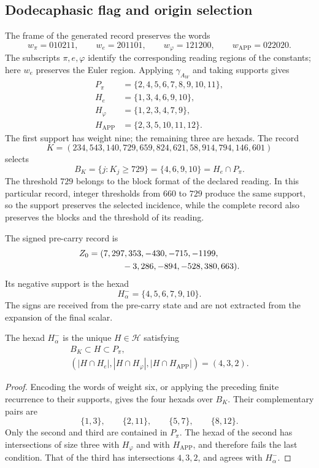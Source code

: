 \subsection{Dodecaphasic flag and origin selection}
\label{subsec:lf-flag}

The frame of the generated record preserves the words
\[
 w_\pi=010211,\qquad
 w_e=201101,\qquad
 w_\varphi=121200,\qquad
 w_{\mathrm{APP}}=022020.
\]
The subscripts \(\pi,e,\varphi\) identify the corresponding
reading regions of the constants; here \(w_e\) preserves
the Euler region. Applying \(\gamma_{A_W}\) and taking supports gives
\[
\begin{aligned}
 P_\pi&=\{2,4,5,6,7,8,9,10,11\},\\
 H_e&=\{1,3,4,6,9,10\},\\
 H_\varphi&=\{1,2,3,4,7,9\},\\
 H_{\mathrm{APP}}&=\{2,3,5,10,11,12\}.
\end{aligned}
\]
The first support has weight nine; the remaining three are
hexads. The record
\[
 K=(234,543,140,729,659,824,621,58,914,794,146,601)
\]
selects
\[
 B_K=\{j:K_j\geq729\}=\{4,6,9,10\}=H_e\cap P_\pi.
\]
The threshold \(729\) belongs to the block format of the
declared reading. In this particular record, integer
thresholds from \(660\) to \(729\) produce the same support, so
the support preserves the selected incidence,
while the complete record also preserves the blocks
and the threshold of its reading.

The signed pre-carry record is
\[
\begin{split}
 Z_0={}&(7,297,353,-430,-715,-1199,\\
       &\hspace{9mm}-3,286,-894,-528,380,663).
\end{split}
\]
Its negative support is the hexad
\[
 H_\alpha^-=\{4,5,6,7,9,10\}.
\]
The signs are received from the pre-carry state and are not
extracted from the expansion of the final scalar.

\begin{proposition}
\label{prop:lf-flag}
The hexad \(H_\alpha^-\) is the unique \(H\in\mathcal H\) satisfying
\[
\begin{gathered}
 B_K\subset H\subset P_\pi,\\
 (|H\cap H_e|,|H\cap H_\varphi|,
                   |H\cap H_{\mathrm{APP}}|)=(4,3,2).
\end{gathered}
\]
\end{proposition}
\begin{proof}
Encoding the words of weight six, or applying the preceding
finite recurrence to their supports, gives the four
hexads over \(B_K\). Their complementary pairs are
\[
 \{1,3\},\qquad\{2,11\},\qquad\{5,7\},\qquad\{8,12\}.
\]
Only the second and third are contained in \(P_\pi\).
The hexad of the second has intersections of size three
with \(H_\varphi\) and with \(H_{\mathrm{APP}}\), and therefore
fails the last condition. That of the third has
intersections \(4,3,2\), and agrees with \(H_\alpha^-\).
\end{proof}


